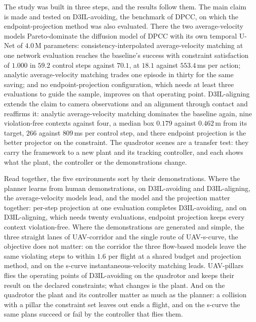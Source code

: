The study was built in three steps, and the results follow them. The main claim is made and tested on
D3IL-avoiding, the benchmark of \ac{DPCC}, on which the endpoint-projection method was also evaluated.
There the two average-velocity models Pareto-dominate the diffusion model of \ac{DPCC} with its own
temporal U-Net of $4.0$\,M parameters: consistency-interpolated average-velocity matching at one
network evaluation reaches the baseline's success with constraint satisfaction of $1.000$ in $59.2$
control steps against $70.1$, at $18.1$ against $553.4$\,ms per action; analytic average-velocity
matching trades one episode in thirty for the same saving; and no endpoint-projection configuration,
which needs at least three evaluations to guide the sample, improves on that operating point.
D3IL-aligning extends the claim to camera observations and an alignment through contact and reaffirms
it: analytic average-velocity matching dominates the baseline again, nine violation-free contexts
against four, a median box $0.179$ against $0.462$\,m from its target, $266$ against $809$\,ms per
control step, and there endpoint projection is the better projector on the constraint. The quadrotor
scenes are a transfer test: they carry the framework to a new plant and its tracking controller, and
each shows what the plant, the controller or the demonstrations change.

Read together, the five environments sort by their demonstrations. Where the planner learns from
human demonstrations, on D3IL-avoiding and D3IL-aligning, the average-velocity models lead, and the
model and the projection matter together: per-step projection at one evaluation completes
D3IL-avoiding, and on D3IL-aligning, which needs twenty evaluations, endpoint projection keeps every
context violation-free. Where the demonstrations are generated and simple, the three straight lanes
of UAV-corridor and the single route of UAV-s-curve, the objective does not matter: on the corridor the
three flow-based models leave the same violating steps to within $1.6$ per flight at a shared budget
and projection method, and on the s-curve instantaneous-velocity matching leads. UAV-pillars flies the
operating points of D3IL-avoiding on the quadrotor and keeps their result on the declared
constraints; what changes is the plant. And on the quadrotor the plant and its controller matter as
much as the planner: a collision with a pillar the constraint set leaves out ends a flight, and on the
s-curve the same plans succeed or fail by the controller that flies them.

